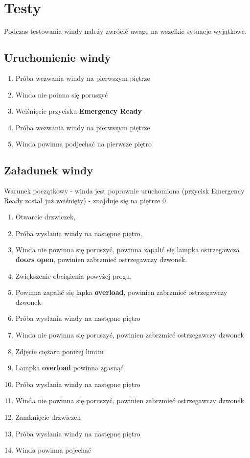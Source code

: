 \documentclass[a4paper,11pt]{article}
\begin{document}
	
\section{Testy}
	Podczas testowania windy należy zwrócić uwagę na wszelkie sytuacje wyjątkowe.
	
	\subsection{Uruchomienie windy}
		\begin{enumerate}
			\item Próba wezwania windy na pierwszym piętrze
			\item Winda nie poinna się poruszyć
			\item Wciśnięcie przycisku \textbf{Emergency Ready}
			\item Próba wezwania windy na pierwszym piętrze 
			\item Winda powinna podjechać na pierwsze piętro
		\end{enumerate}
	\subsection{Załadunek windy}
		Warunek początkowy - winda jest poprawnie uruchomiona (przycisk Emergency Ready został już wciśnięty) - znajduje się na piętrze 0
		\begin{enumerate}
			\item Otwarcie drzwiczek,
			\item Próba wysłania windy na następne piętro,
			\item Winda nie powinna się poruszyć, powinna zapalić się lampka ostrzegawcza \textbf{doors open}, powinien zabrzmieć ostrzegawczy dzwonek.
			\item Zwiększenie obciążenia powyżej progu,
			\item Powinna zapalić się lapka \textbf{overload}, powinien zabrzmieć ostrzegawczy dzwonek
			\item Próba wysłania windy na następne piętro 
			\item Winda nie powinna się poruszyć, powinien zabrzmieć ostrzegawczy dzwonek
			\item Zdjęcie ciężaru poniżej limitu
			\item Lampka \textbf{overload} powinna zgasnąć
			\item Próba wysłania windy na następne piętro
			\item Winda nie powinna się poruszyć, powinien zabrzmieć ostrzegawczy dzwonek
			\item Zamknięcie drzwiczek
			\item Próba wysłania windy na następne piętro
			\item Winda powinna pojechać			
		\end{enumerate}
\end{document}
